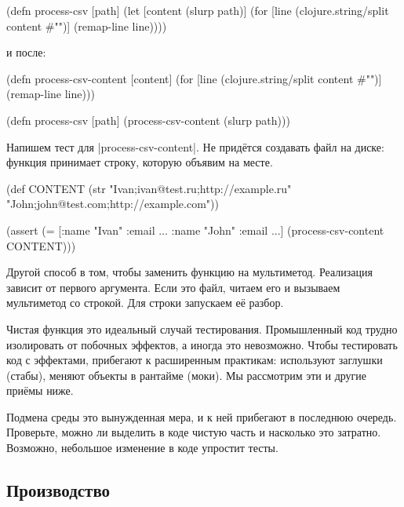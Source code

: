 
\begin{english}
  \begin{clojure}
(defn process-csv [path]
  (let [content (slurp path)]
    (for [line (clojure.string/split content #"\n")]
      (remap-line line))))
  \end{clojure}
\end{english}

\noindent
и после:

\begin{english}
  \begin{clojure}
(defn process-csv-content [content]
  (for [line (clojure.string/split content #"\n")]
    (remap-line line)))

(defn process-csv [path]
  (process-csv-content (slurp path)))
  \end{clojure}
\end{english}

Напишем тест для \spverb|process-csv-content|. Не придётся создавать файл на
диске: функция принимает строку, которую объявим на месте.

\begin{english}
  \begin{clojure}
(def CONTENT
  (str "Ivan;ivan@test.ru;http://example.ru"
       \newline
       "John;john@test.com;http://example.com"))

(assert (= [{:name "Ivan" :email ...}
            {:name "John" :email ...}]
           (process-csv-content CONTENT)))
  \end{clojure}
\end{english}

Другой способ в том, чтобы заменить функцию на мультиметод. Реализация
зависит от первого аргумента. Если это файл, читаем его и вызываем мультиметод
со строкой. Для строки запускаем её разбор.

Чистая функция это идеальный случай тестирования. Промышленный код трудно
изолировать от побочных эффектов, а иногда это невозможно. Чтобы тестировать код
с эффектами, прибегают к расширенным практикам: используют заглушки (стабы),
меняют объекты в рантайме (моки). Мы рассмотрим эти и другие приёмы ниже.

Подмена среды это вынужденная мера, и к ней прибегают в последнюю
очередь. Проверьте, можно ли выделить в коде чистую часть и насколько это
затратно. Возможно, небольшое изменение в коде упростит тесты.

\subsection{Производство}

